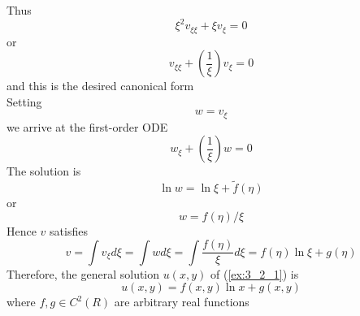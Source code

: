 \documentclass[11pt]{report}
\newcommand{\sps}{\\[0.2cm]}
\begin{document}
	Thus
	\begin{equation*}
		\xi^2v_{\xi\xi} + \xi v_\xi = 0\label{ex:3_2_6}
	\end{equation*}
	or
	\begin{equation*}
		v_{\xi\xi} + \left(\frac{1}{\xi}\right)v_\xi = 0\label{ex:3_2_7}
	\end{equation*}
	and this is the desired canonical form\sps
	Setting 
	\begin{equation*}
		w = v_{\xi}\label{ex:3_2_8}
	\end{equation*}
	we arrive at the first-order ODE
	\begin{equation*}
		w_\xi + \left(\frac{1}{\xi}\right)w=0\label{ex:3_2_9}
	\end{equation*}
	The solution is
	\begin{equation*}
		\ln w = \ln \xi + \widetilde{f}(\eta)\label{ex:3_2_10}
	\end{equation*}
	or
	\begin{equation*}
		w = f(\eta)/\xi\label{ex:3_2_11}
	\end{equation*}
	Hence $v$ satisfies
	\begin{equation*}
		v = \int v_\xi d\xi = \int w d\xi = \int \frac{f(\eta)}{\xi}d\xi = f(\eta)\ln\xi + g(\eta)\label{ex:3_2_12}
	\end{equation*}
	Therefore, the general solution $u(x,y)$ of (\ref{ex:3_2_1}) is
	\begin{equation*}
		u(x,y) = f(x,y)\ln x + g(x,y)\label{ex:3_2_13}
	\end{equation*}
	where $f,g \in C^2(R)$ are arbitrary real functions\sps
	{~}\sps
	
\end{document}
